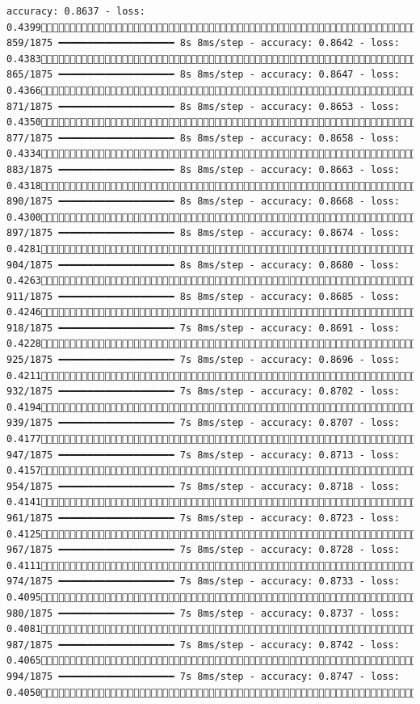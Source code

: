 \documentclass[
  letterpaper,
  DIV=11,
  numbers=noendperiod]{scrreprt}
\begin{document}
\begin{verbatim}
accuracy: 0.8637 - loss: 0.4399 859/1875 ━━━━━━━━━━━━━━━━━━━━ 8s 8ms/step - accuracy: 0.8642 - loss: 0.4383 865/1875 ━━━━━━━━━━━━━━━━━━━━ 8s 8ms/step - accuracy: 0.8647 - loss: 0.4366 871/1875 ━━━━━━━━━━━━━━━━━━━━ 8s 8ms/step - accuracy: 0.8653 - loss: 0.4350 877/1875 ━━━━━━━━━━━━━━━━━━━━ 8s 8ms/step - accuracy: 0.8658 - loss: 0.4334 883/1875 ━━━━━━━━━━━━━━━━━━━━ 8s 8ms/step - accuracy: 0.8663 - loss: 0.4318 890/1875 ━━━━━━━━━━━━━━━━━━━━ 8s 8ms/step - accuracy: 0.8668 - loss: 0.4300 897/1875 ━━━━━━━━━━━━━━━━━━━━ 8s 8ms/step - accuracy: 0.8674 - loss: 0.4281 904/1875 ━━━━━━━━━━━━━━━━━━━━ 8s 8ms/step - accuracy: 0.8680 - loss: 0.4263 911/1875 ━━━━━━━━━━━━━━━━━━━━ 8s 8ms/step - accuracy: 0.8685 - loss: 0.4246 918/1875 ━━━━━━━━━━━━━━━━━━━━ 7s 8ms/step - accuracy: 0.8691 - loss: 0.4228 925/1875 ━━━━━━━━━━━━━━━━━━━━ 7s 8ms/step - accuracy: 0.8696 - loss: 0.4211 932/1875 ━━━━━━━━━━━━━━━━━━━━ 7s 8ms/step - accuracy: 0.8702 - loss: 0.4194 939/1875 ━━━━━━━━━━━━━━━━━━━━ 7s 8ms/step - accuracy: 0.8707 - loss: 0.4177 947/1875 ━━━━━━━━━━━━━━━━━━━━ 7s 8ms/step - accuracy: 0.8713 - loss: 0.4157 954/1875 ━━━━━━━━━━━━━━━━━━━━ 7s 8ms/step - accuracy: 0.8718 - loss: 0.4141 961/1875 ━━━━━━━━━━━━━━━━━━━━ 7s 8ms/step - accuracy: 0.8723 - loss: 0.4125 967/1875 ━━━━━━━━━━━━━━━━━━━━ 7s 8ms/step - accuracy: 0.8728 - loss: 0.4111 974/1875 ━━━━━━━━━━━━━━━━━━━━ 7s 8ms/step - accuracy: 0.8733 - loss: 0.4095 980/1875 ━━━━━━━━━━━━━━━━━━━━ 7s 8ms/step - accuracy: 0.8737 - loss: 0.4081 987/1875 ━━━━━━━━━━━━━━━━━━━━ 7s 8ms/step - accuracy: 0.8742 - loss: 0.4065 994/1875 ━━━━━━━━━━━━━━━━━━━━ 7s 8ms/step - accuracy: 0.8747 - loss: 0.40501001/1875 
\end{verbatim}
\end{document}
